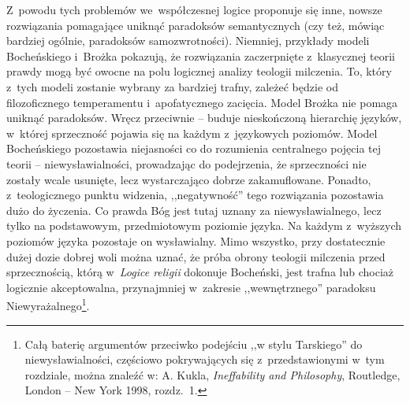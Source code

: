 Z~powodu tych problemów we~współczesnej logice proponuje się inne, nowsze rozwiązania pomagające uniknąć paradoksów semantycznych (czy też, mówiąc bardziej ogólnie, paradoksów samozwrotności). Niemniej, przykłady modeli Bocheńskiego i~Brożka pokazują, że rozwiązania zaczerpnięte z~klasycznej teorii prawdy mogą być owocne na polu logicznej analizy teologii milczenia. To, który z~tych modeli zostanie wybrany za bardziej trafny, zależeć będzie od filozoficznego temperamentu i~apofatycznego zacięcia. Model Brożka nie pomaga uniknąć paradoksów. Wręcz przeciwnie -- buduje nieskończoną hierarchię języków, w~której sprzeczność pojawia się na każdym z~językowych poziomów. Model Bocheńskiego pozostawia niejasności co do rozumienia centralnego pojęcia tej teorii -- niewysławialności, prowadzając do podejrzenia, że sprzeczności nie zostały wcale usunięte, lecz wystarczająco dobrze zakamuflowane. Ponadto, z~teologicznego punktu widzenia, ,,negatywność'' tego rozwiązania pozostawia dużo do życzenia. Co prawda Bóg jest tutaj uznany za niewysławialnego, lecz tylko na podstawowym, przedmiotowym poziomie języka. Na każdym z~wyższych poziomów języka pozostaje on wysławialny. Mimo wszystko, przy dostatecznie dużej dozie dobrej woli można uznać, że próba obrony teologii milczenia przed sprzecznością, którą w~\textit{Logice religii} dokonuje Bocheński, jest trafna lub chociaż logicznie akceptowalna, przynajmniej w~zakresie ,,wewnętrznego'' paradoksu Niewyrażalnego\footnote{Całą baterię argumentów przeciwko podejściu ,,w stylu Tarskiego'' do niewysławialności, częściowo pokrywających się z~przedstawionymi w~tym rozdziale, można znaleźć w: A. Kukla, \textit{Ineffability and Philosophy}, Routledge, London -- New York 1998, rozdz.~1.}.

